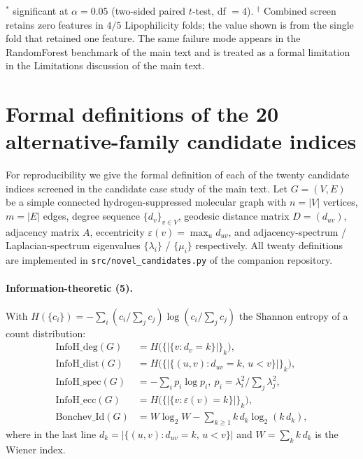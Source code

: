 \documentclass[11pt,a4paper]{article}
\begin{document}
\begin{table}[!htbp]
\vspace{0.5em}
\noindent\small{$^{*}$ significant at $\alpha=0.05$ (two-sided paired $t$-test, df $=4$). $^\dagger$ Combined screen retains zero features in $4/5$ Lipophilicity folds; the value shown is from the single fold that retained one feature. The same failure mode appears in the RandomForest benchmark of the main text and is treated as a formal limitation in the Limitations discussion of the main text.}
\end{table}

\section{Formal definitions of the 20 alternative-family candidate indices}\label{app:candidates}

For reproducibility we give the formal definition of each of the
twenty candidate indices screened in the candidate case study of the main text. Let
$G = (V, E)$ be a simple connected hydrogen-suppressed molecular
graph with $n = |V|$ vertices, $m = |E|$ edges, degree sequence
$\{d_v\}_{v\in V}$, geodesic distance matrix $D = (d_{uv})$,
adjacency matrix $A$, eccentricity $\varepsilon(v) = \max_u d_{uv}$,
and adjacency-spectrum / Laplacian-spectrum eigenvalues
$\{\lambda_i\}$ / $\{\mu_i\}$ respectively. All twenty definitions
are implemented in
\texttt{src/novel\_candidates.py} of the companion repository.

\paragraph{Information-theoretic (5).}
With $H(\{c_i\}) = -\sum_i (c_i / \sum_j c_j)\log(c_i / \sum_j c_j)$
the Shannon entropy of a count distribution:
\begin{align*}
\mathrm{InfoH\_deg}(G) &= H\bigl(\{|\{v : d_v = k\}|\}_k\bigr), \\
\mathrm{InfoH\_dist}(G) &= H\bigl(\{|\{(u,v) : d_{uv} = k,\, u<v\}|\}_k\bigr), \\
\mathrm{InfoH\_spec}(G) &= -\sum_{i} p_i \log p_i,\ p_i = \lambda_i^2 / \textstyle\sum_j \lambda_j^2, \\
\mathrm{InfoH\_ecc}(G) &= H\bigl(\{|\{v : \varepsilon(v) = k\}|\}_k\bigr), \\
\mathrm{Bonchev\_Id}(G) &= W\log_2 W - \sum_{k \ge 1} k\,d_k \log_2(k\,d_k),
\end{align*}
where in the last line $d_k = |\{(u,v) : d_{uv}=k,\,u<v\}|$ and
$W = \sum_k k\,d_k$ is the Wiener index.
\end{document}
